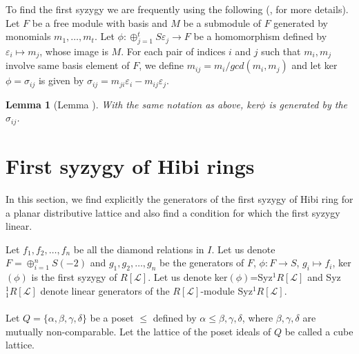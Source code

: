 \documentclass[10pt,reqno]{amsart}
\numberwithin{equation}{section}
\newtheorem{lemma}[theorem]{Lemma}
\begin{document}
To find the first syzygy we are frequently using the following (\cite{eisenbud_commutative}, for more details).
Let $F$ be a free module with basis and $M$ be a submodule of $F$ generated by monomials $m_1,\ldots,m_t$. Let $\phi: \oplus_{j=1}^{t} S \varepsilon_{j} \longrightarrow F$ 
be a homomorphism defined by $\varepsilon_i \longmapsto m_j$, whose image is $M$. For each pair of indices $i$ and $j$ such that $m_i, m_j$ involve same basis element of $F$, we define $m_{ij}=m_i/gcd(m_i,m_j)$ and let ker$\phi=\sigma_{ij}$ is given by $\sigma_{ij}=m_{ji}\varepsilon_i-m_{ij}\varepsilon_j$.
\begin{lemma}[Lemma \cite{eisenbud_commutative}] With the same notation as above, ker$\phi$ is generated by the $\sigma_{ij}$. 
\end{lemma}

\section{First syzygy of Hibi rings}\label{Hibi_ring}
In this section, we find explicitly the generators of the first syzygy of Hibi ring for a planar distributive lattice and also find a condition for which the first syzygy linear.

Let $f_1, f_2, \ldots, f_n$ be all the diamond relations in $I$. Let us denote $F=\oplus_{i=1}^{n} S(-2)$ 
and $g_1,g_2,\ldots,g_n$ be the generators of $F$,
 $\phi: F \longrightarrow S$, $g_i \longmapsto f_i$, ker$(\phi)$ is the
first syzygy of $R[\mathcal{L}]$. Let us denote ker$(\phi)$=Syz$^{1}R[\mathcal{L}]$ and Syz$^{1}_{1} R[\mathcal{L}]$ denote linear 
generators of the  $R[\mathcal{L}]$-module Syz$^{1}R[\mathcal{L}]$.\\ \\
Let $Q=\{\alpha,\beta,\gamma,\delta\}$ be a poset $\leq$ defined by $\alpha \leq \beta,\gamma,\delta$, where $\beta,\gamma,\delta$ are mutually non-comparable. Let the lattice of the poset 
ideals of $Q$ be called a cube lattice.
\end{document}
